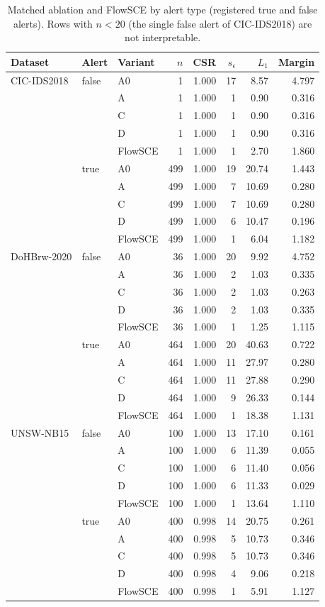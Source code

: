 \begin{table}[t]
\centering\footnotesize
\caption{Matched ablation and FlowSCE by alert type (registered true and false alerts). Rows with $n<20$ (the single false alert of CIC-IDS2018) are not interpretable.}
\label{tab:a-alerttype}
\begin{tabular}{@{}lllrrrrr@{}}
\toprule
Dataset & Alert & Variant & $n$ & CSR & $s_\epsilon$ & $L_1$ & Margin \\
\midrule
CIC-IDS2018 & false & A0 & 1 & 1.000 & 17 & 8.57 & 4.797 \\
 &  & A & 1 & 1.000 & 1 & 0.90 & 0.316 \\
 &  & C & 1 & 1.000 & 1 & 0.90 & 0.316 \\
 &  & D & 1 & 1.000 & 1 & 0.90 & 0.316 \\
 &  & FlowSCE & 1 & 1.000 & 1 & 2.70 & 1.860 \\
 & true & A0 & 499 & 1.000 & 19 & 20.74 & 1.443 \\
 &  & A & 499 & 1.000 & 7 & 10.69 & 0.280 \\
 &  & C & 499 & 1.000 & 7 & 10.69 & 0.280 \\
 &  & D & 499 & 1.000 & 6 & 10.47 & 0.196 \\
 &  & FlowSCE & 499 & 1.000 & 1 & 6.04 & 1.182 \\
\midrule
DoHBrw-2020 & false & A0 & 36 & 1.000 & 20 & 9.92 & 4.752 \\
 &  & A & 36 & 1.000 & 2 & 1.03 & 0.335 \\
 &  & C & 36 & 1.000 & 2 & 1.03 & 0.263 \\
 &  & D & 36 & 1.000 & 2 & 1.03 & 0.335 \\
 &  & FlowSCE & 36 & 1.000 & 1 & 1.25 & 1.115 \\
 & true & A0 & 464 & 1.000 & 20 & 40.63 & 0.722 \\
 &  & A & 464 & 1.000 & 11 & 27.97 & 0.280 \\
 &  & C & 464 & 1.000 & 11 & 27.88 & 0.290 \\
 &  & D & 464 & 1.000 & 9 & 26.33 & 0.144 \\
 &  & FlowSCE & 464 & 1.000 & 1 & 18.38 & 1.131 \\
\midrule
UNSW-NB15 & false & A0 & 100 & 1.000 & 13 & 17.10 & 0.161 \\
 &  & A & 100 & 1.000 & 6 & 11.39 & 0.055 \\
 &  & C & 100 & 1.000 & 6 & 11.40 & 0.056 \\
 &  & D & 100 & 1.000 & 6 & 11.33 & 0.029 \\
 &  & FlowSCE & 100 & 1.000 & 1 & 13.64 & 1.110 \\
 & true & A0 & 400 & 0.998 & 14 & 20.75 & 0.261 \\
 &  & A & 400 & 0.998 & 5 & 10.73 & 0.346 \\
 &  & C & 400 & 0.998 & 5 & 10.73 & 0.346 \\
 &  & D & 400 & 0.998 & 4 & 9.06 & 0.218 \\
 &  & FlowSCE & 400 & 0.998 & 1 & 5.91 & 1.127 \\
\bottomrule
\end{tabular}
\end{table}
